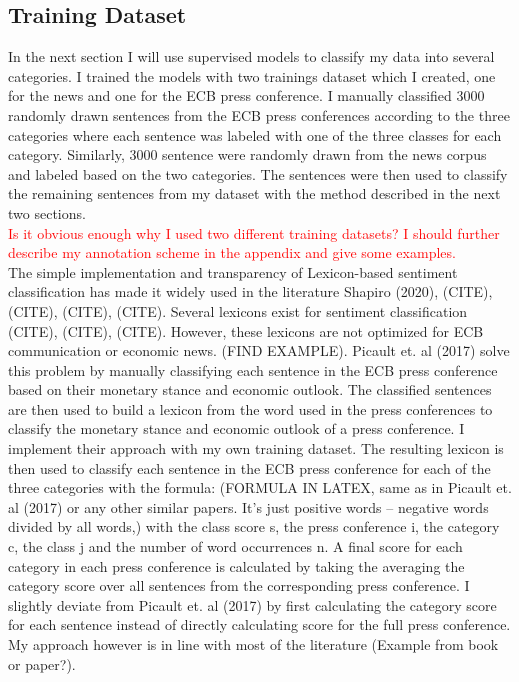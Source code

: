 \documentclass[review]{elsarticle}
\begin{document}
\subsection{Training Dataset}
In the next section I will use supervised models to classify my data into several categories. I trained the models with two trainings dataset which I created, one for the news and one for the ECB press conference. I manually classified 3000 randomly drawn sentences from the ECB press conferences according to the three categories where each sentence was labeled with one of the three classes for each category.  Similarly, 3000 sentence were randomly drawn from the news corpus and labeled based on the two categories. The sentences were then used to classify the remaining sentences from my dataset with the method described in the next two sections.
\\
\textcolor{red}{Is it obvious enough why I used two different training datasets? I should further describe my annotation scheme in the appendix and give some examples.}
\\
The simple implementation and transparency of Lexicon-based sentiment classification has made it widely used in the literature Shapiro (2020), (CITE), (CITE), (CITE), (CITE). Several lexicons exist for sentiment classification (CITE), (CITE), (CITE). However, these lexicons are not optimized for ECB communication or economic news. (FIND EXAMPLE). Picault et. al (2017) solve this problem by manually classifying each sentence in the ECB press conference based on their monetary stance and economic outlook. The classified sentences are then used to build a lexicon from the word used in the press conferences to classify the monetary stance and economic outlook of a press conference. I implement their approach with my own training dataset. The resulting lexicon is then used to classify each sentence in the ECB press conference for each of the three categories with the formula:
(FORMULA IN LATEX, same as in Picault et. al (2017) or any other similar papers. It’s just positive words – negative words divided by all words,)
with the class score s, the press conference i, the category c, the class j and the number of word occurrences n. A final score for each category in each press conference is calculated by taking the averaging the category score over all sentences from the corresponding press conference.
I slightly deviate from Picault et. al (2017) by first calculating the category score for each sentence instead of directly calculating score for the full press conference. My approach however is in line with most of the literature (Example from book or paper?).
\end{document}
